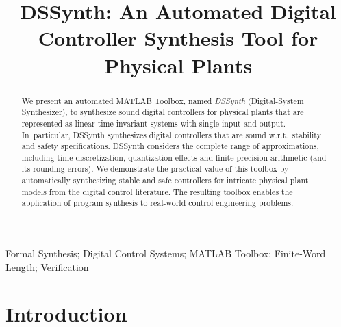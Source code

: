 \documentclass[10pt,conference]{IEEEtran}
\begin{document}
\title{DSSynth: An Automated Digital Controller Synthesis Tool for Physical Plants} 

\author{
}

			
\maketitle

\begin{abstract}
%
We present an automated MATLAB Toolbox, named \emph{DSSynth} (Digital-System
Synthesizer), to synthesize sound digital controllers for physical plants
that are represented as linear time-invariant systems with single input and
output.  In~particular, DSSynth synthesizes digital controllers that are
sound w.r.t.~stability and safety specifications.  DSSynth considers the
complete range of approximations, including time discretization,
quantization effects and finite-precision arithmetic (and its rounding
errors).  We demonstrate the practical value of
this toolbox by automatically synthesizing stable and safe controllers for intricate
physical plant models from the digital control literature.
The resulting toolbox enables the application of program synthesis
to real-world control engineering problems.
%
\end{abstract}

%
%
\begin{IEEEkeywords}
Formal Synthesis; Digital Control Systems; MATLAB Toolbox; Finite-Word Length; Verification
\end{IEEEkeywords}

\section{Introduction}
\end{document}
